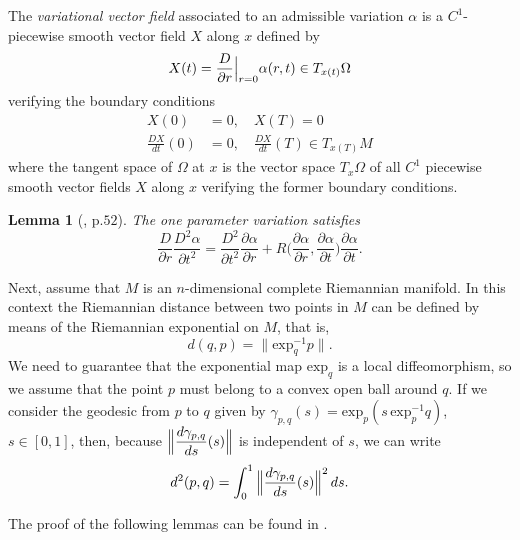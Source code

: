 \documentclass[letterpaper, 10 pt, conference]{ieeeconf}  %
\newtheorem{lemma}[definition]{Lemma}
\begin{document}
 The \textit{variational vector field} associated to an admissible variation $\alpha$ is a $C^1$-piecewise smooth vector  field $X$ along $x$ defined by $$X(t) = \frac{D}{\partial r}\Big{|}_{r=0}\alpha(r,t) \in T_{x(t)}\Omega$$ verifying the boundary conditions 
\begin{align*}
X(0)&=0, \quad X(T) = 0 \\
\frac{DX}{dt}(0)&=0, \quad \frac{DX}{dt}(T) \in T_{x(T)}M
\end{align*} where the tangent space of $\Omega$ at $x$ is the vector space $T_{x}\Omega$ of all $C^1$ piecewise smooth vector fields $X$ along $x$ verifying the former boundary conditions. 



\begin{lemma}[\cite{Milnor}, p.$52$]\label{curvature_lemma}
The one parameter variation satisfies
\begin{equation*}
\frac{D}{\partial r}\frac{D^2\alpha}{\partial t^2} = \frac{D^2}{\partial t^2}\frac{\partial \alpha}{\partial r} + R \Big( \frac{\partial \alpha}{\partial r},\frac{\partial \alpha}{\partial t} \Big)\frac{\partial \alpha}{\partial t}.
\end{equation*}
\end{lemma}

Next, assume that $M$ is an $n$-dimensional complete Riemannian manifold. In this context the Riemannian distance between two points in $M$ can be defined by means of the Riemannian exponential on $M$, that is,
$$d(q,p)=\|\mbox{exp}_q^{-1}p\|.$$ We need to guarantee that the exponential map $\mbox{exp}_q$ is a local diffeomorphism, so  we assume that the point $p$ must belong to a convex open  ball around $q$.   If we consider the geodesic from $p$ to $q$ given by
$\gamma_{p,q}(s)= \mbox{exp}_p(s\, \mbox{exp}_p^{-1}q)$, $s\in[0,1]$, then, because $\displaystyle{\Big{\|}\frac{d \gamma_{p,q}}{d s}(s)\Big{\|}}$ is independent of $s$, we can write $$d^2(p,q)=\int_{0}^{1}\Big{\|}\frac{d \gamma_{p,q}}{d s}(s)\Big{\|}^2\, ds.$$



The proof of the following lemmas can be found in \cite{do1992riemannian}.
\end{document}
